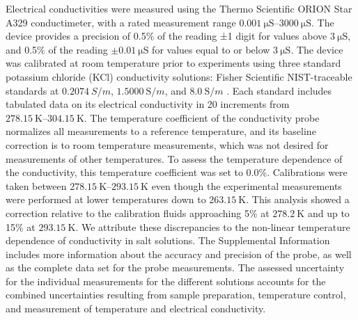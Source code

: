 \documentclass[journal=aesccq,manuscript=article]{achemso}
\begin{document}
Electrical conductivities were measured using the Thermo Scientific ORION Star A329 conductimeter, with a rated measurement range $\SIrange{0.001}{3000}{\micro\siemens}$. 
The device provides a precision of 0.5\% of the reading ±1 digit for values above $\SI{3}{\micro \siemens}$, and 0.5\% of the reading $±\SI{0.01}{\micro \siemens}$ for values equal to or below $\SI{3}{\micro \siemens}$.
The device was calibrated at room temperature prior to experiments using three standard potassium chloride (KCl) conductivity solutions: Fisher Scientific NIST-traceable standards at 
$\SI{0.2074}{S \per m}$, $\SI{1.5000}{\siemens \per m}$, and $\SI{8.0}{\siemens \per m}$
. 
Each standard includes tabulated data on its electrical conductivity in 20 increments from $\SIrange{278.15}{304.15}{\kelvin}$. 
The temperature coefficient of the conductivity probe normalizes all measurements to a reference temperature, and its baseline correction is to room temperature measurements, which was not desired for measurements of other temperatures. 
To assess the temperature dependence of the conductivity, this temperature coefficient was set to 0.0\%. 
Calibrations were taken between $\SIrange[]{278.15}{293.15}{\kelvin}$ even though the experimental measurements were performed at lower temperatures down to $\SI{263.15}{\kelvin}$.
This analysis showed a correction relative to the calibration fluids approaching 5\% at $\SI{278.2}{\kelvin}$ and up to 15\% at $\SI{293.15}{\kelvin}$. 
We attribute these discrepancies to the non-linear temperature dependence of conductivity in salt solutions. 
The Supplemental Information includes more information about the accuracy and precision of the probe, as well as the complete data set for the probe measurements.
The assessed uncertainty for the individual measurements for the different solutions accounts for the combined uncertainties resulting from sample preparation, temperature control, and  measurement of temperature and electrical conductivity.
\end{document}
